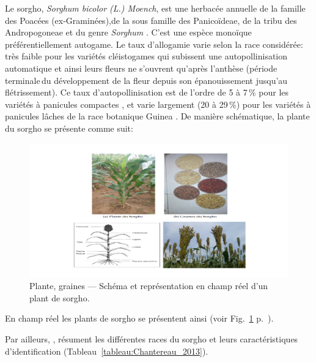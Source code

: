 \documentclass[a4paper,11pt]{article}
\begin{document}
Le sorgho, \emph{Sorghum bicolor (L.) Moench}, est une herbacée
annuelle de la famille des Poacées (ex-Graminées),de la sous famille
des Panicoïdeae, de la tribu des Andropogoneae et du genre
\emph{Sorghum} \cite{Doggett_1988}.  C'est une espèce monoïque
préférentiellement autogame. Le taux d'allogamie varie selon la race
considérée: très faible pour les variétés cléistogames qui subissent
une autopollinisation automatique et ainsi leurs fleurs ne s'ouvrent
qu'après l'anthèse (période terminale\,du développement de la fleur
depuis son épanouissement jusqu'au flétrissement). Ce taux
d'autopollinisation est de l'ordre de 5 à 7\,\% pour les variétés à
panicules compactes \cite{Doggett_1988}, et varie largement (20 à
29\,\%) pour les variétés à panicules lâches de la race botanique
Guinea \cite{Ollitrault_1987,Chantereau_1994}. De manière schématique,
la plante du sorgho se présente comme suit:



\begin{figure}%
  \begin{center}
    \includegraphics[width=16cm]{images/SchemaComposePage5}
  \end{center}
  \caption{Plante, graines --- Schéma et représentation en champ réel d'un plant de sorgho.}
  \label{fig-SchemaComposePage5}
\end{figure}

En champ réel les plants de sorgho se présentent ainsi (voir
Fig.~\ref{fig-SchemaComposePage5}
p.~\pageref{fig-SchemaComposePage5}).


Par ailleurs, , résument les différentes
races du sorgho et leurs caractéristiques d'identification
(Tableau~\ref{tableau:Chantereau_2013}).
\end{document}
